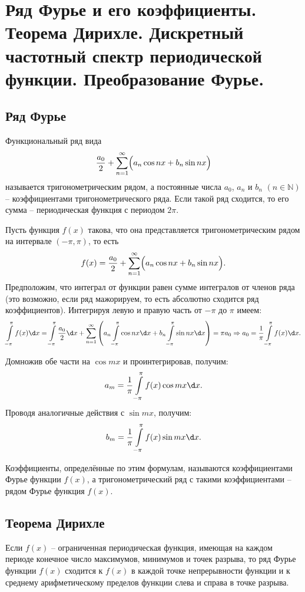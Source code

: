 \chapter{Ряд Фурье и его коэффициенты. Теорема Дирихле. Дискретный частотный
спектр периодической функции. Преобразование Фурье.}

\section{Ряд Фурье}
Функциональный ряд вида
\[
    \frac{a_0}{2} + \sum\limits_{n=1}^\infty \Bigl(a_n\cos nx + b_n\sin nx\Bigr)
\]
называется тригонометрическим рядом, а постоянные числа \( a_0 \), \( a_n \) и
\( b_n \) \( (n \in \mathbb{N}) \) -- коэффициентами тригонометрического ряда.
Если такой ряд сходится, то его сумма -- периодическая функция с периодом
\( 2\pi \).

Пусть функция \( f(x) \) такова, что она представляется тригонометрическим рядом
на интервале \( (-\pi, \pi) \), то есть
\[
    f(x) = \frac{a_0}{2} + \sum\limits_{n=1}^\infty \Bigl(a_n\cos nx +
    b_n\sin nx\Bigr).
\]
Предположим, что интеграл от функции равен сумме интегралов от членов ряда
(это возможно, если ряд мажорируем, то есть абсолютно сходится ряд
коэффициентов). Интегрируя левую и правую часть от \( -\pi \) до \( \pi \)
имеем:
\[
    \int\limits_{-\pi}^\pi f(x)\d x = \int\limits_{-\pi}^\pi \frac{a_0}{2}\d x +
    \sum\limits_{n=1}^\infty \left(a_n\int\limits_{-\pi}^\pi \cos nx\d x + b_n
    \int\limits_{-\pi}^\pi \sin nx\d x\right) = \pi a_0 \Rightarrow
    a_0 = \frac{1}{\pi}\int\limits_{-\pi}^\pi f(x) \d x.
\]

Домножив обе части на \( \cos mx \) и проинтегрировав, получим:
\[
    a_m = \frac{1}{\pi} \int\limits_{-\pi}^\pi f(x)\cos mx\d x.
\]
Проводя аналогичные действия с \( \sin mx \), получим:
\[
    b_m = \frac{1}{\pi} \int\limits_{-\pi}^\pi f(x)\sin mx \d x.
\]

Коэффициенты, определённые по этим формулам, называются коэффициентами Фурье
функции \( f(x) \), а тригонометрический ряд с такими коэффициентами -- рядом
Фурье функция \( f(x) \).

\section{Теорема Дирихле}
Если \( f(x) \) -- ограниченная периодическая функция, имеющая на каждом периоде
конечное число максимумов, минимумов и точек разрыва, то ряд Фурье функции
\( f(x) \) сходится к \( f(x) \) в каждой точке непрерывности функции и к
среднему арифметическому пределов функции слева и справа в точке разрыва.

